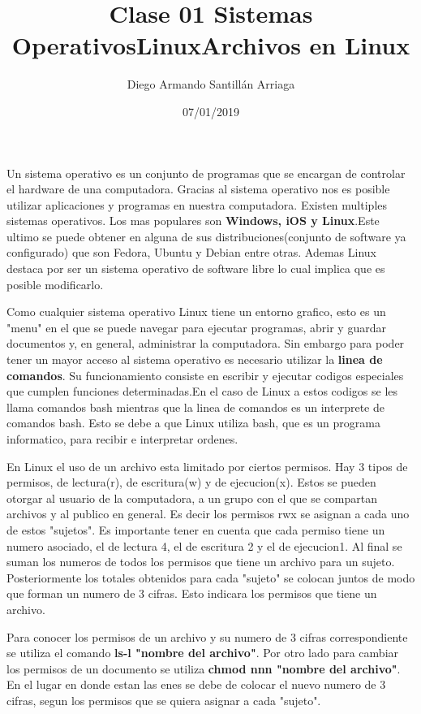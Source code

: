 \documentclass[letter paper, 12pt, oneside]{article}
\title{\Huge Clase 01}
\author{Diego Armando Santillán Arriaga}
\date{07/01/2019}
\begin{document}
	\maketitle
\newpage
\title{\huge\textbf{ Sistemas Operativos}}

Un sistema operativo es un conjunto de programas que se encargan de controlar el hardware de una computadora. Gracias al sistema operativo nos es posible utilizar aplicaciones y programas en nuestra computadora. 
Existen multiples sistemas operativos. Los mas populares son \textbf{Windows, iOS y Linux}.Este ultimo se puede obtener en alguna de sus distribuciones(conjunto de software ya configurado) que son Fedora, Ubuntu y Debian entre otras. Ademas Linux destaca por ser un sistema operativo de software libre lo cual implica que es posible modificarlo.

\title{\huge\textbf{Linux}}

Como cualquier sistema operativo Linux tiene un entorno grafico, esto es un "menu" en el que se puede navegar para ejecutar programas, abrir y guardar documentos y, en general, administrar la computadora. Sin embargo para poder tener un mayor acceso al sistema operativo es necesario utilizar la \textbf{linea de comandos}. Su funcionamiento consiste en escribir y ejecutar codigos especiales que cumplen funciones determinadas.En el caso de Linux a estos codigos se les llama comandos bash mientras que la linea de comandos es un interprete de comandos bash. Esto se debe a que Linux utiliza bash, que es un programa informatico, para recibir e interpretar ordenes. 

 \title{\huge\textbf{Archivos en Linux}}
 
 
 En Linux el uso de un archivo esta limitado por ciertos permisos. Hay 3 tipos de permisos, de lectura(r), de escritura(w) y de ejecucion(x).
 Estos se pueden otorgar al usuario de la computadora, a un grupo con el que se compartan archivos y al publico en general. Es decir los permisos rwx se asignan a cada uno de estos "sujetos". Es importante tener en cuenta que cada permiso tiene un numero asociado, el de lectura 4, el de escritura 2 y el de ejecucion1. Al final se suman los numeros de todos los permisos que tiene un archivo para un sujeto. Posteriormente los totales obtenidos para cada "sujeto" se colocan juntos de modo que forman un numero de 3 cifras. Esto indicara los permisos que tiene un archivo.  
 
 Para conocer los permisos de un archivo y su numero de 3 cifras correspondiente se utiliza el comando \textbf{ls-l  "nombre del archivo"}. Por otro lado para cambiar los permisos de un documento se utiliza \textbf{chmod nnn "nombre del archivo"}. En el lugar en donde estan las enes se debe de colocar el nuevo numero de 3 cifras, segun los permisos que se quiera asignar a cada "sujeto".
 
\end{document}
